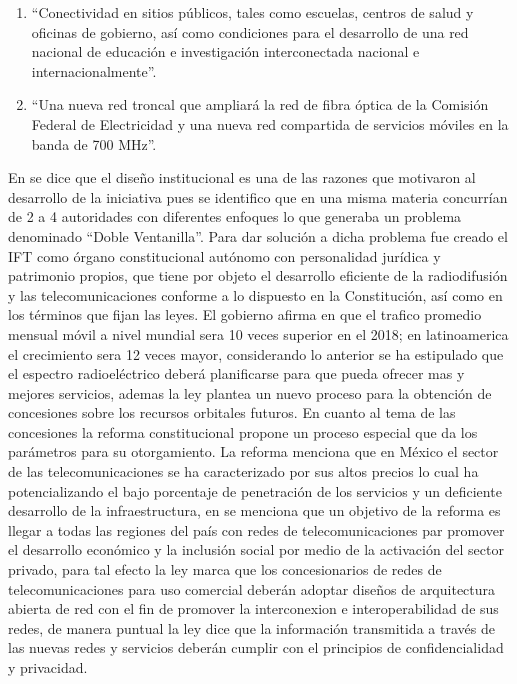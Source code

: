 \documentclass[runningheads,a4paper]{llncs}
\begin{document}
\begin{enumerate}
	\item ``Conectividad en sitios públicos, tales como escuelas, centros de salud y oficinas de gobierno, así como condiciones para el desarrollo de una red nacional de educación e investigación interconectada nacional e internacionalmente''.\\
	\item ``Una nueva red troncal que ampliará la red de fibra óptica de la Comisión Federal de 	Electricidad y una nueva red compartida de servicios móviles en la banda de 700 MHz''.
\end{enumerate}

En \cite{RMT_1} se dice que el diseño institucional es una de las razones que motivaron al desarrollo de la iniciativa pues se identifico que en una misma materia concurrían de 2 a 4 autoridades con diferentes enfoques lo que generaba un problema denominado ``Doble Ventanilla''. Para dar solución a dicha problema fue creado el \gls{IFT} como órgano constitucional autónomo con personalidad jurídica y patrimonio propios, que tiene por objeto el desarrollo eficiente de la radiodifusión y las telecomunicaciones conforme a lo dispuesto en la Constitución, así como en los términos que fijan las leyes. El gobierno afirma en \cite{RMT_1} que el trafico promedio mensual móvil a nivel mundial sera 10 veces superior en el 2018; en latinoamerica el crecimiento sera 12 veces mayor, considerando lo anterior se ha estipulado que el espectro radioeléctrico deberá planificarse para que pueda ofrecer mas y mejores servicios, ademas la ley plantea un nuevo proceso para la obtención de concesiones sobre los recursos orbitales futuros. En cuanto al tema de las concesiones la reforma constitucional propone un proceso especial que da los parámetros para su otorgamiento. La reforma menciona que en México el sector de las telecomunicaciones se ha caracterizado por sus altos precios lo cual ha potencializando el bajo porcentaje de penetración de los servicios y un deficiente desarrollo de la infraestructura, en \cite{RMT_1} se menciona que un objetivo de la reforma es llegar a todas las regiones del país con redes de telecomunicaciones par promover el desarrollo económico y la inclusión social por medio de la activación del sector privado, para tal efecto la ley marca que los concesionarios de redes de telecomunicaciones para uso comercial deberán adoptar diseños de arquitectura abierta de red con el fin de promover la interconexion e interoperabilidad de sus redes, de manera puntual la ley dice que la información transmitida a través de las nuevas redes y servicios deberán cumplir con el principios de confidencialidad y privacidad.\\
\end{document}
